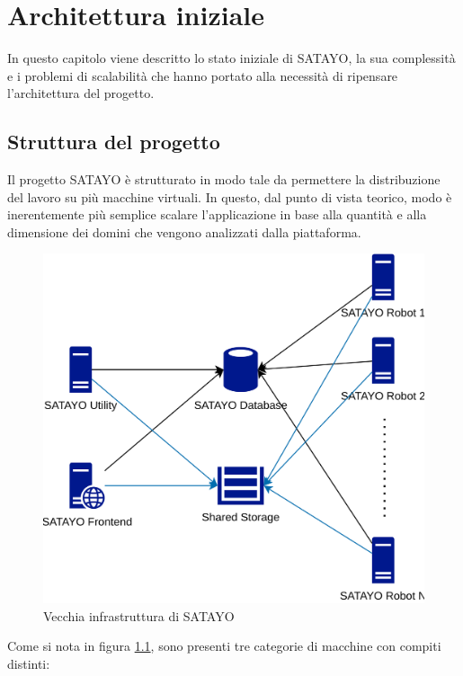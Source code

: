 \chapter{Architettura iniziale}
\label{cha:architettura_iniziale}

In questo capitolo viene descritto lo stato iniziale di SATAYO, la sua complessità
e i problemi di scalabilità che hanno portato alla necessità di ripensare l'architettura
del progetto.

\section{Struttura del progetto}
\label{sec:struttura}

Il progetto SATAYO è strutturato in modo tale da permettere la distribuzione del
lavoro su più macchine virtuali. In questo, dal punto di vista teorico, modo è inerentemente
più semplice scalare l'applicazione in base alla quantità e alla dimensione dei domini
che vengono analizzati dalla piattaforma.

\begin{figure}[h!]
  \centering
  \includegraphics[width=.6\linewidth]{images/SATAYO_infrastructure_old.png}
  \caption{Vecchia infrastruttura di SATAYO}
  \label{fig:infra_old}
\end{figure}

Come si nota in figura \ref{fig:infra_old}, sono presenti tre categorie di macchine
con compiti distinti:

